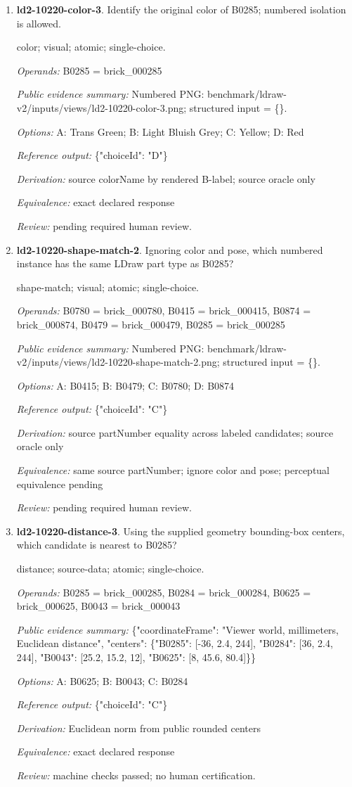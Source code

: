 \begin{enumerate}
\item \textbf{ld2-10220-color-3}. Identify the original color of B0285; numbered isolation is allowed.
\par{\small color; visual; atomic; single-choice.\par\textit{Operands:} B0285 = brick\_000285\par\textit{Public evidence summary:} Numbered PNG: benchmark/ldraw-v2/inputs/views/ld2-10220-color-3.png; structured input = \{\}.\par\textit{Options:} A: Trans Green; B: Light Bluish Grey; C: Yellow; D: Red\par\textit{Reference output:} \{"choiceId": "D"\}\par\textit{Derivation:} source colorName by rendered B-label; source oracle only\par\textit{Equivalence:} exact declared response\par\textit{Review:} pending required human review.}
\item \textbf{ld2-10220-shape-match-2}. Ignoring color and pose, which numbered instance has the same LDraw part type as B0285?
\par{\small shape-match; visual; atomic; single-choice.\par\textit{Operands:} B0780 = brick\_000780, B0415 = brick\_000415, B0874 = brick\_000874, B0479 = brick\_000479, B0285 = brick\_000285\par\textit{Public evidence summary:} Numbered PNG: benchmark/ldraw-v2/inputs/views/ld2-10220-shape-match-2.png; structured input = \{\}.\par\textit{Options:} A: B0415; B: B0479; C: B0780; D: B0874\par\textit{Reference output:} \{"choiceId": "C"\}\par\textit{Derivation:} source partNumber equality across labeled candidates; source oracle only\par\textit{Equivalence:} same source partNumber; ignore color and pose; perceptual equivalence pending\par\textit{Review:} pending required human review.}
\item \textbf{ld2-10220-distance-3}. Using the supplied geometry bounding-box centers, which candidate is nearest to B0285?
\par{\small distance; source-data; atomic; single-choice.\par\textit{Operands:} B0285 = brick\_000285, B0284 = brick\_000284, B0625 = brick\_000625, B0043 = brick\_000043\par\textit{Public evidence summary:} \{"coordinateFrame": "Viewer world, millimeters, Euclidean distance", "centers": \{"B0285": [-36, 2.4, 244], "B0284": [36, 2.4, 244], "B0043": [25.2, 15.2, 12], "B0625": [8, 45.6, 80.4]\}\}\par\textit{Options:} A: B0625; B: B0043; C: B0284\par\textit{Reference output:} \{"choiceId": "C"\}\par\textit{Derivation:} Euclidean norm from public rounded centers\par\textit{Equivalence:} exact declared response\par\textit{Review:} machine checks passed; no human certification.}

\end{enumerate}
